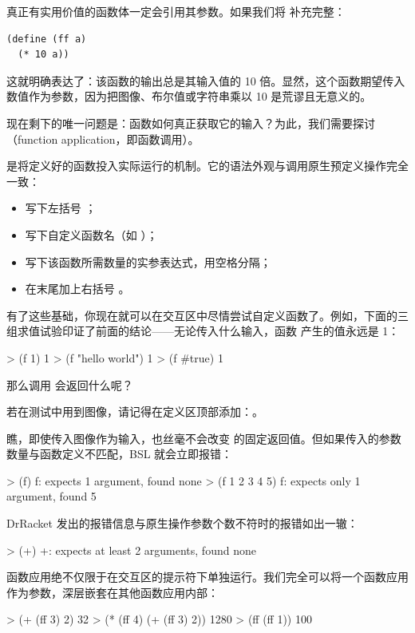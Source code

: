 真正有实用价值的函数体一定会引用其参数。如果我们将  补充完整：
\begin{lstlisting}[language=BSL]
(define (ff a)
  (* 10 a))
\end{lstlisting}
这就明确表达了：该函数的输出总是其输入值的 10 倍。显然，这个函数期望传入数值作为参数，因为把图像、布尔值或字符串乘以 10 是荒谬且无意义的。

现在剩下的唯一问题是：函数如何真正获取它的输入？为此，我们需要探讨（function application，即函数调用）。

是将定义好的函数投入实际运行的机制。它的语法外观与调用原生预定义操作完全一致：
\begin{itemize}
  \item 写下左括号 \code{(}；
  \item 写下自定义函数名（如 ）；
  \item 写下该函数所需数量的实参表达式，用空格分隔；
  \item 在末尾加上右括号 \code{)}。
\end{itemize}

有了这些基础，你现在就可以在交互区中尽情尝试自定义函数了。例如，下面的三组求值试验印证了前面的结论——无论传入什么输入，函数  产生的值永远是 1：
\begin{replbox}
> (f 1)
1
> (f "hello world")
1
> (f #true)
1
\end{replbox}

那么调用  会返回什么呢？

\begin{notebox}[引入图像库]
若在测试中用到图像，请记得在定义区顶部添加：。
\end{notebox}

瞧，即使传入图像作为输入，也丝毫不会改变  的固定返回值。但如果传入的参数数量与函数定义不匹配，BSL 就会立即报错：
\begin{replbox}
> (f)
f: expects 1 argument, found none
> (f 1 2 3 4 5)
f: expects only 1 argument, found 5
\end{replbox}

DrRacket 发出的报错信息与原生操作参数个数不符时的报错如出一辙：
\begin{replbox}
> (+)
+: expects at least 2 arguments, found none
\end{replbox}

函数应用绝不仅限于在交互区的提示符下单独运行。我们完全可以将一个函数应用作为参数，深层嵌套在其他函数应用内部：
\begin{replbox}
> (+ (ff 3) 2)
32
> (* (ff 4) (+ (ff 3) 2))
1280
> (ff (ff 1))
100
\end{replbox}

